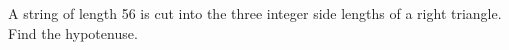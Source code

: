 A string of length 56 is cut into the three integer side lengths of a right triangle. Find the hypotenuse.
